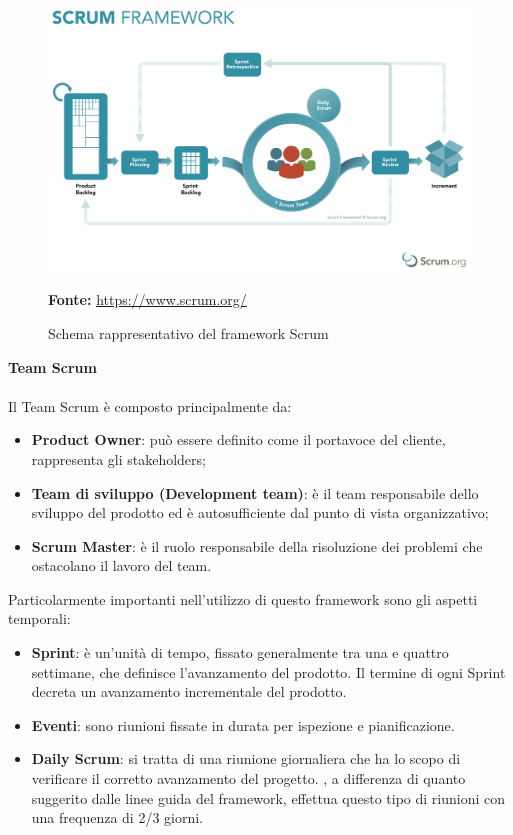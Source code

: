 \begin{figure}[H]
	\begin{center}
	\includegraphics[scale=0.3]{immagini/scrum.png}
	\caption{Schema rappresentativo del framework Scrum}
	\small{\textbf{Fonte:} \url{https://www.scrum.org/}}
	\end{center}
\end{figure}

\noindent \textbf{Team Scrum}\\
\\
Il Team Scrum è composto principalmente da: 
\begin{itemize}
\item \textbf{Product Owner}: può essere definito come il portavoce del cliente, rappresenta gli stakeholders;
\item \textbf{Team di sviluppo (Development team)}: è il team responsabile dello sviluppo del prodotto ed è autosufficiente dal punto di vista organizzativo;
\item \textbf{Scrum Master}: è il ruolo responsabile della risoluzione dei problemi che ostacolano il lavoro del team.
\end{itemize}

\noindent Particolarmente importanti nell'utilizzo di questo framework sono gli aspetti temporali:

\begin{itemize}
\item \textbf{Sprint}: è un'unità di tempo, fissato generalmente tra una e quattro settimane, che definisce l'avanzamento del prodotto. Il termine di ogni Sprint decreta un avanzamento incrementale del prodotto.
\item \textbf{Eventi}: sono riunioni fissate in durata per ispezione e pianificazione.
\item \textbf{Daily Scrum}: si tratta di una riunione giornaliera che ha lo scopo di verificare il corretto avanzamento del progetto. \lab{}, a differenza di quanto suggerito dalle linee guida del framework, effettua questo tipo di riunioni con una frequenza di 2/3 giorni.
\end{itemize}

